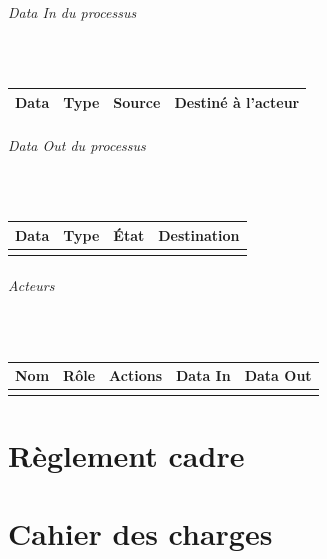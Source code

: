 \documentclass[a4paper,11pt]{report}
\begin{document}
\paragraph{Data In du processus}~\newline{}

\begin{tabularx}{\linewidth}{|X|X|X|X|} \hline
Data & Type & Source & Destiné à l'acteur \\ \hline
\end{tabularx}

\paragraph{Data Out du processus}~\newline{}

\begin{tabularx}{\linewidth}{|X|X|X|X|} \hline
Data & Type & État & Destination \\ \hline
 &  &  &  \\ \hline
\end{tabularx}

\paragraph{Acteurs}~\newline{}

\begin{tabularx}{\linewidth}{|X|X|X|X|X|} \hline
Nom & Rôle & Actions & Data In & Data Out \\ \hline 
& &  &  &  \\ \hline
\end{tabularx}





\appendix
\renewcommand{\partname}{Annexe}
\setcounter{part}{0}%
\part{Règlement cadre}\label{an:regl-cadre}


\part{Cahier des charges}

\end{document}

